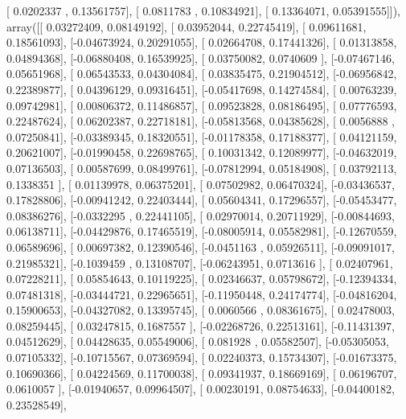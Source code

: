\documentclass{article}
\begin{document}
       [ 0.0202337 ,  0.13561757],
       [ 0.0811783 ,  0.10834921],
       [ 0.13364071,  0.05391555]]), array([[ 0.03272409,  0.08149192],
       [ 0.03952044,  0.22745419],
       [ 0.09611681,  0.18561093],
       [-0.04673924,  0.20291055],
       [ 0.02664708,  0.17441326],
       [ 0.01313858,  0.04894368],
       [-0.06880408,  0.16539925],
       [ 0.03750082,  0.0740609 ],
       [-0.07467146,  0.05651968],
       [ 0.06543533,  0.04304084],
       [ 0.03835475,  0.21904512],
       [-0.06956842,  0.22389877],
       [ 0.04396129,  0.09316451],
       [-0.05417698,  0.14274584],
       [ 0.00763239,  0.09742981],
       [ 0.00806372,  0.11486857],
       [ 0.09523828,  0.08186495],
       [ 0.07776593,  0.22487624],
       [ 0.06202387,  0.22718181],
       [-0.05813568,  0.04385628],
       [ 0.0056888 ,  0.07250841],
       [-0.03389345,  0.18320551],
       [-0.01178358,  0.17188377],
       [ 0.04121159,  0.20621007],
       [-0.01990458,  0.22698765],
       [ 0.10031342,  0.12089977],
       [-0.04632019,  0.07136503],
       [ 0.00587699,  0.08499761],
       [-0.07812994,  0.05184908],
       [ 0.03792113,  0.1338351 ],
       [ 0.01139978,  0.06375201],
       [ 0.07502982,  0.06470324],
       [-0.03436537,  0.17828806],
       [-0.00941242,  0.22403444],
       [ 0.05604341,  0.17296557],
       [-0.05453477,  0.08386276],
       [-0.0332295 ,  0.22441105],
       [ 0.02970014,  0.20711929],
       [-0.00844693,  0.06138711],
       [-0.04429876,  0.17465519],
       [-0.08005914,  0.05582981],
       [-0.12670559,  0.06589696],
       [ 0.00697382,  0.12390546],
       [-0.0451163 ,  0.05926511],
       [-0.09091017,  0.21985321],
       [-0.1039459 ,  0.13108707],
       [-0.06243951,  0.0713616 ],
       [ 0.02407961,  0.07228211],
       [ 0.05854643,  0.10119225],
       [ 0.02346637,  0.05798672],
       [-0.12394334,  0.07481318],
       [-0.03444721,  0.22965651],
       [-0.11950448,  0.24174774],
       [-0.04816204,  0.15900653],
       [-0.04327082,  0.13395745],
       [ 0.0060566 ,  0.08361675],
       [ 0.02478003,  0.08259445],
       [ 0.03247815,  0.1687557 ],
       [-0.02268726,  0.22513161],
       [-0.11431397,  0.04512629],
       [ 0.04428635,  0.05549006],
       [ 0.081928  ,  0.05582507],
       [-0.05305053,  0.07105332],
       [-0.10715567,  0.07369594],
       [ 0.02240373,  0.15734307],
       [-0.01673375,  0.10690366],
       [ 0.04224569,  0.11700038],
       [ 0.09341937,  0.18669169],
       [ 0.06196707,  0.0610057 ],
       [-0.01940657,  0.09964507],
       [ 0.00230191,  0.08754633],
       [-0.04400182,  0.23528549],
\end{document}
